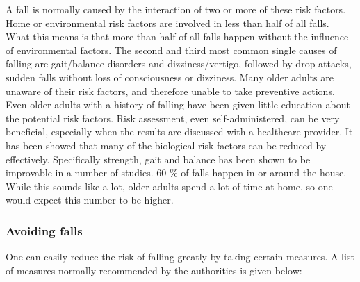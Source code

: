 A fall is normally caused by the interaction of two or more of these risk factors. Home or environmental risk factors are involved in less than half of all falls. What this means is that more than half of all falls happen without the influence of environmental factors. The second and third most common single causes of falling are gait/balance disorders and dizziness/vertigo, followed by drop attacks, sudden falls without loss of consciousness or dizziness.
	Many older adults are unaware of their risk factors, and therefore unable to take preventive actions. Even older adults with a history of falling have been given little education about the potential risk factors. Risk assessment, even self-administered, can be very beneficial, especially when the results are discussed with a healthcare provider.
	It has been showed that many of the biological risk factors can be reduced by effectively. Specifically strength, gait and balance has been shown to be improvable in a number of studies.
60 \% of falls happen in or around the house. While this sounds like a lot, older adults spend a lot of time at home, so one would expect this number to be higher.

\subsubsection{Avoiding falls}

One can easily reduce the risk of falling greatly by taking certain measures. A list of measures normally recommended by the authorities is given below:

